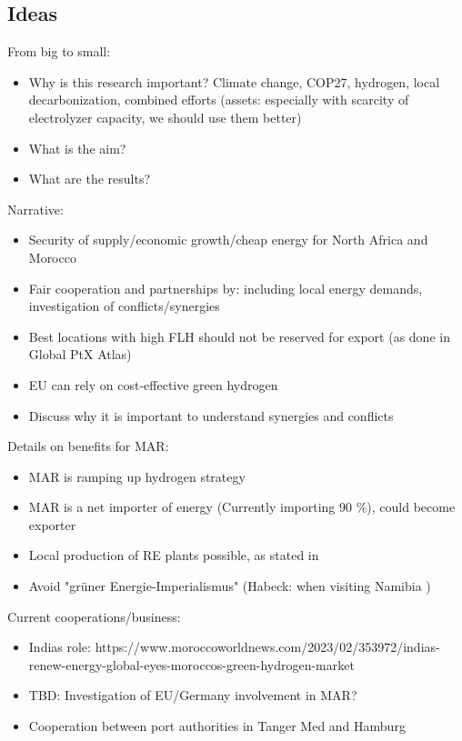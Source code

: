 
\subsection{Ideas}
From big to small:
\begin{itemize}
    \item Why is this research important? Climate change, COP27, hydrogen, local decarbonization, combined efforts (assets: especially with scarcity of electrolyzer capacity, we should use them better)
    \item What is the aim?
    \item What are the results?
\end{itemize}

Narrative: 
\begin{itemize}
    \item Security of supply/economic growth/cheap energy for North Africa and Morocco
    \item Fair cooperation and partnerships by: including local energy demands, investigation of conflicts/synergies
    \item Best locations with high FLH should not be reserved for export (as done in Global PtX Atlas)
    \item EU can rely on cost-effective green hydrogen
    \item Discuss why it is important to understand synergies and conflicts
\end{itemize}

Details on benefits for MAR:
\begin{itemize}
    \item MAR is ramping up hydrogen strategy
    \item MAR is a net importer of energy (Currently importing 90 \%), could become exporter
    \item Local production of RE plants possible, as stated in \cite{Ersoy2022}
    \item Avoid "gr{\"u}ner Energie-Imperialismus" (Habeck: when visiting Namibia ) \cite{HabeckEnergieimperialismus}
\end{itemize}

Current cooperations/business:
\begin{itemize}
    \item Indias role: https://www.moroccoworldnews.com/2023/02/353972/indias-renew-energy-global-eyes-moroccos-green-hydrogen-market
    \item TBD: Investigation of EU/Germany involvement in MAR?
    \item Cooperation between port authorities in Tanger Med and Hamburg
\end{itemize}

